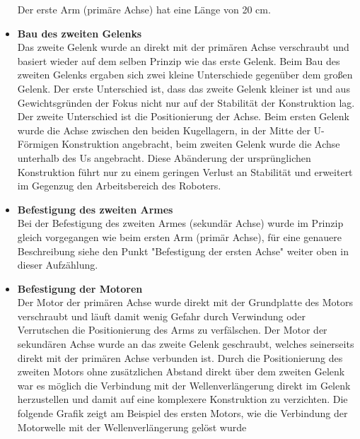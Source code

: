 \begin{itemize}
Der erste Arm (primäre Achse) hat eine Länge von 20 cm.
\item \textbf{Bau des zweiten Gelenks}\\
Das zweite Gelenk wurde an direkt mit der primären Achse verschraubt und basiert wieder auf dem selben Prinzip wie das erste Gelenk. Beim Bau des zweiten Gelenks ergaben sich zwei kleine Unterschiede gegenüber dem großen Gelenk. Der erste Unterschied ist, dass das zweite Gelenk kleiner ist und aus Gewichtsgründen der Fokus nicht nur auf der Stabilität der Konstruktion lag. 
Der zweite Unterschied ist die Positionierung der Achse. Beim ersten Gelenk wurde die Achse zwischen den beiden Kugellagern, in der Mitte der U-Förmigen Konstruktion angebracht, beim zweiten Gelenk wurde die Achse unterhalb des Us angebracht. Diese Abänderung der ursprünglichen Konstruktion führt nur zu einem geringen Verlust an Stabilität und erweitert im Gegenzug den Arbeitsbereich des Roboters.
\item \textbf{Befestigung des zweiten Armes}\\
Bei der Befestigung des zweiten Armes (sekundär Achse) wurde im Prinzip gleich vorgegangen wie beim ersten Arm (primär Achse), für eine genauere Beschreibung siehe den Punkt "Befestigung der ersten Achse" weiter oben in dieser Aufzählung.
\item \textbf{Befestigung der Motoren}\\
Der Motor der primären Achse wurde direkt mit der Grundplatte des Motors verschraubt und läuft damit wenig Gefahr durch Verwindung oder Verrutschen die Positionierung des Arms zu verfälschen.
Der Motor der sekundären Achse wurde an das zweite Gelenk geschraubt, welches seinerseits direkt mit der primären Achse verbunden ist. Durch die Positionierung des zweiten Motors ohne zusätzlichen Abstand direkt über dem zweiten Gelenk war es möglich die Verbindung mit der Wellenverlängerung direkt im Gelenk herzustellen und damit auf eine komplexere Konstruktion zu verzichten. Die folgende Grafik zeigt am Beispiel des ersten Motors, wie die Verbindung der Motorwelle mit der Wellenverlängerung gelöst wurde
\end{itemize}
